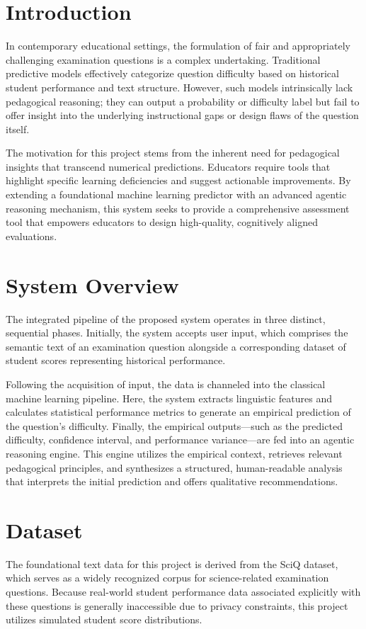 \documentclass[12pt,a4paper]{article}
\begin{document}
\section{Introduction}
In contemporary educational settings, the formulation of fair and appropriately challenging examination questions is a complex undertaking. Traditional predictive models effectively categorize question difficulty based on historical student performance and text structure. However, such models intrinsically lack pedagogical reasoning; they can output a probability or difficulty label but fail to offer insight into the underlying instructional gaps or design flaws of the question itself. 

The motivation for this project stems from the inherent need for pedagogical insights that transcend numerical predictions. Educators require tools that highlight specific learning deficiencies and suggest actionable improvements. By extending a foundational machine learning predictor with an advanced agentic reasoning mechanism, this system seeks to provide a comprehensive assessment tool that empowers educators to design high-quality, cognitively aligned evaluations.

\section{System Overview}
The integrated pipeline of the proposed system operates in three distinct, sequential phases. Initially, the system accepts user input, which comprises the semantic text of an examination question alongside a corresponding dataset of student scores representing historical performance. 

Following the acquisition of input, the data is channeled into the classical machine learning pipeline. Here, the system extracts linguistic features and calculates statistical performance metrics to generate an empirical prediction of the question's difficulty. Finally, the empirical outputs—such as the predicted difficulty, confidence interval, and performance variance—are fed into an agentic reasoning engine. This engine utilizes the empirical context, retrieves relevant pedagogical principles, and synthesizes a structured, human-readable analysis that interprets the initial prediction and offers qualitative recommendations.

\section{Dataset}
The foundational text data for this project is derived from the SciQ dataset, which serves as a widely recognized corpus for science-related examination questions. Because real-world student performance data associated explicitly with these questions is generally inaccessible due to privacy constraints, this project utilizes simulated student score distributions. 
\end{document}
